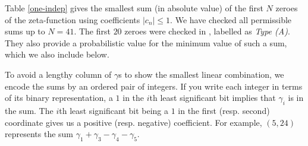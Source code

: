 \documentclass{article}
\numberwithin{equation}{section}
\begin{document}
Table \ref{one-indep} gives the smallest sum (in absolute value) of the first $N$ zeroes of the zeta-function using coefficients $|c_n| \leq 1$. We have checked all permissible sums up to $N=41$. The first $20$ zeroes were checked in \cite[Table I]{Bateman}, labelled as {\it Type (A)}. They also provide a probabilistic value for the minimum value of such a sum, which we also include below.

To avoid a lengthy column of $\gamma$s to show the smallest linear combination, we encode the sums by an ordered pair of integers. If you write each integer in terms of its binary representation, a $1$ in the $i$th least significant bit implies that $\gamma_i$ is in the sum. The $i$th least significant bit being a $1$ in the first (resp. second) coordinate gives us a positive (resp. negative) coefficient. For example, $(5,24)$ represents the sum $\gamma_1+\gamma_3-\gamma_4-\gamma_5$.
\end{document}
